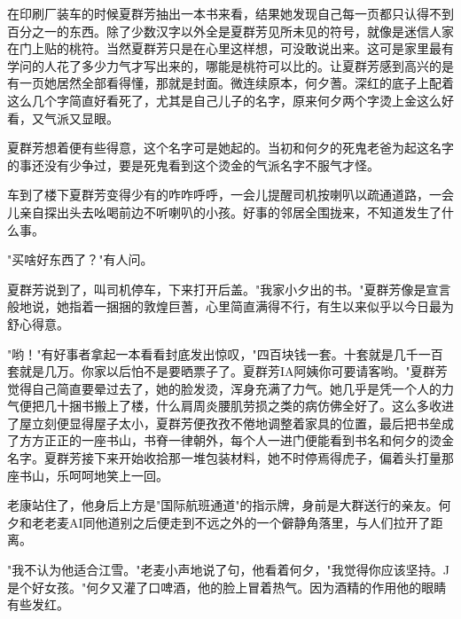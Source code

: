 \documentclass[UTF8]{ctexart}
\begin{document}
在印刷厂装车的时候夏群芳抽出一本书来看，结果她发现自己每一页都只认得不到百分之一的东西。除了少数汉字以外全是夏群芳见所未见的符号，就像是迷信人家在门上贴的桃符。当然夏群芳只是在心里这样想，可没敢说出来。这可是家里最有学问的人花了多少力气才写出来的，哪能是桃符可以比的。让夏群芳感到高兴的是有一页她居然全部看得懂，那就是封面。微连续原本，何夕蓍。深红的底子上配着这么几个字简直好看死了，尤其是自己儿子的名字，原来何夕两个字烫上金这么好看，又气派又显眼。

夏群芳想着便有些得意，这个名字可是她起的。当初和何夕的死鬼老爸为起这名字的事还没有少争过，要是死鬼看到这个烫金的气派名字不服气才怪。

车到了楼下夏群芳变得少有的咋咋呼呼，一会儿提醒司机按喇叭以疏通道路，一会儿亲自探出头去吆喝前边不听喇叭的小孩。好事的邻居全围拢来，不知道发生了什么事。

"买啥好东西了？"有人问。

夏群芳说到了，叫司机停车，下来打开后盖。"我家小夕出的书。"夏群芳像是宣言般地说，她指着一捆捆的敦煌巨蓍，心里简直满得不行，有生以来似乎以今日最为舒心得意。

"哟！"有好事者拿起一本看看封底发出惊叹，"四百块钱一套。十套就是几千一百套就是几万。你家以后怕不是要晒票子了。夏群芳IA阿姨你可要请客哟。"夏群芳觉得自己简直要晕过去了，她的脸发烫，浑身充满了力气。她几乎是凭一个人的力气便把几十捆书搬上了楼，什么肩周炎腰肌劳损之类的病仿佛全好了。这么多收进了屋立刻便显得屋子太小，夏群芳便孜孜不倦地调整着家具的位置，最后把书垒成了方方正正的一座书山，书脊一律朝外，每个人一进门便能看到书名和何夕的烫金名字。夏群芳接下来开始收拾那一堆包装材料，她不时停焉得虎子，偏着头打量那座书山，乐呵呵地笑上一回。

老康站住了，他身后上方是"国际航班通道"的指示牌，身前是大群送行的亲友。何夕和老老麦AI同他道别之后便走到不远之外的一个僻静角落里，与人们拉开了距离。

"我不认为他适合江雪。"老麦小声地说了句，他看着何夕，"我觉得你应该坚持。J是个好女孩。"何夕又灌了口啤酒，他的脸上冒着热气。因为酒精的作用他的眼睛有些发红。
\end{document}

